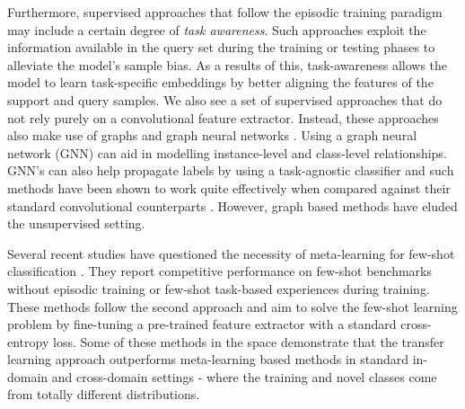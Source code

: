 Furthermore, supervised approaches that follow the episodic training paradigm may include a certain degree of \textit{task awareness}.
Such approaches exploit the information available in the query set during the training or testing phases \cite{bateni2022enhancing, ye2020few, Cui2021} to alleviate the model's sample bias. As a results of this, task-awareness allows the model to learn task-specific embeddings by better aligning the features of the support and query samples.
We also see a set of supervised approaches that do not rely purely on a convolutional feature extractor. Instead, these approaches also make use of graphs and graph neural networks \cite{garcia2018fewshot, kim2019edge, yu2022hybrid, yang2020dpgn}. Using a graph neural network (GNN) can aid in modelling instance-level and class-level relationships. GNN's can also help propagate labels by using a task-agnostic classifier and such methods have been shown to work quite effectively when compared against their standard convolutional counterparts \cite{kim2019edge, garcia2018fewshot, yu2022hybrid, yang2020dpgn}. However, graph based methods have eluded the unsupervised setting.

Several recent studies have questioned the necessity of meta-learning for few-shot classification \cite{goodemballneed2020, Medina2020Self-SupervisedClassification, dhillon2019baseline, ziko2020laplacian, boudiaf2020information,chen2021self, shirekar2022self}. They report competitive performance on few-shot benchmarks without episodic training or few-shot task-based experiences during training. These methods follow the second approach and aim to solve the few-shot learning problem by fine-tuning a pre-trained feature extractor with a standard cross-entropy loss.
Some of these methods \cite{Medina2020Self-SupervisedClassification, goodemballneed2020, das2022confess} in the space demonstrate that the transfer learning approach outperforms meta-learning based methods in standard in-domain and cross-domain settings - where the training and novel classes come from totally different distributions.